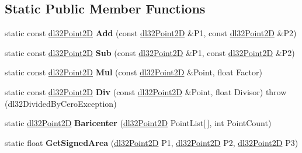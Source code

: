 \subsection*{Static Public Member Functions}
\begin{DoxyCompactItemize}
\item 
\hypertarget{structdl32_point2_d_a8237dabb9363f4dadab04c10c78726fd}{static const \hyperlink{structdl32_point2_d}{dl32\-Point2\-D} {\bfseries Add} (const \hyperlink{structdl32_point2_d}{dl32\-Point2\-D} \&P1, const \hyperlink{structdl32_point2_d}{dl32\-Point2\-D} \&P2)}\label{structdl32_point2_d_a8237dabb9363f4dadab04c10c78726fd}

\item 
\hypertarget{structdl32_point2_d_a68ada1ce82671cd63c4b681c8cbb7d68}{static const \hyperlink{structdl32_point2_d}{dl32\-Point2\-D} {\bfseries Sub} (const \hyperlink{structdl32_point2_d}{dl32\-Point2\-D} \&P1, const \hyperlink{structdl32_point2_d}{dl32\-Point2\-D} \&P2)}\label{structdl32_point2_d_a68ada1ce82671cd63c4b681c8cbb7d68}

\item 
\hypertarget{structdl32_point2_d_a571c88bb780e4734281e218b99748408}{static const \hyperlink{structdl32_point2_d}{dl32\-Point2\-D} {\bfseries Mul} (const \hyperlink{structdl32_point2_d}{dl32\-Point2\-D} \&Point, float Factor)}\label{structdl32_point2_d_a571c88bb780e4734281e218b99748408}

\item 
\hypertarget{structdl32_point2_d_a2fbc5d3168185e5ccaee61c5f3e4990f}{static const \hyperlink{structdl32_point2_d}{dl32\-Point2\-D} {\bfseries Div} (const \hyperlink{structdl32_point2_d}{dl32\-Point2\-D} \&Point, float Divisor)  throw (dl32\-Divided\-By\-Cero\-Exception)}\label{structdl32_point2_d_a2fbc5d3168185e5ccaee61c5f3e4990f}

\item 
\hypertarget{structdl32_point2_d_ab57187a9fcc306a853055937c598f7d6}{static \hyperlink{structdl32_point2_d}{dl32\-Point2\-D} {\bfseries Baricenter} (\hyperlink{structdl32_point2_d}{dl32\-Point2\-D} Point\-List\mbox{[}$\,$\mbox{]}, int Point\-Count)}\label{structdl32_point2_d_ab57187a9fcc306a853055937c598f7d6}

\item 
\hypertarget{structdl32_point2_d_a96c0a31afb70d3dc13b2f6d28e8c5476}{static float {\bfseries Get\-Signed\-Area} (\hyperlink{structdl32_point2_d}{dl32\-Point2\-D} P1, \hyperlink{structdl32_point2_d}{dl32\-Point2\-D} P2, \hyperlink{structdl32_point2_d}{dl32\-Point2\-D} P3)}\label{structdl32_point2_d_a96c0a31afb70d3dc13b2f6d28e8c5476}

\end{DoxyCompactItemize}
